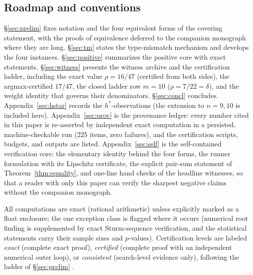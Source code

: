 \subsection{Roadmap and conventions}

\S\ref{sec:prelim} fixes notation and the four equivalent forms of the
covering statement, with the proofs of equivalence deferred to the
companion monograph where they are long. \S\ref{sec:tm} states the
type-mismatch mechanism and develops the four instances.
\S\ref{sec:positive} summarizes the positive core with exact statements.
\S\ref{sec:witness} presents the witness archive and the certification
ladder, including the exact value $\rho=16/47$ (certified from both
sides), the argmax-certified $17/47$, the closed ladder row $m=10$
($\rho=7/22=\delta$), and
the weight identity that governs their denominators.
\S\ref{sec:concl} concludes. Appendix~\ref{sec:hstar} records the
$h^*$-observations (the extension to $n=9,10$ is included here).
Appendix~\ref{sec:prov} is the provenance ledger: every number cited in
this paper is re-asserted by independent exact computation in a
persisted, machine-checkable run (225 items, zero failures), and the
certification scripts, budgets, and outputs are listed.
Appendix~\ref{sec:self} is the self-contained verification core: the
elementary identity behind the four forms, the runner formulation with
its Lipschitz certificate, the explicit pair-sum statement of
Theorem~\ref{thm:equality}, and one-line hand checks of the headline
witnesses, so that a reader with only this paper can verify the sharpest
negative claims without the companion monograph.

All computations are exact (rational arithmetic) unless explicitly marked
as a float enclosure; the one exception class is flagged where it occurs
(numerical root finding is supplemented by exact Sturm-sequence
verification, and the statistical statements carry their sample sizes and
$p$-values). Certification levels are labeled \emph{exact}
(complete exact proof), \emph{certified} (complete proof with an
independent numerical outer loop), or \emph{consistent} (search-level
evidence only), following the ladder of \S\ref{sec:prelim}
\cite{prog-artifacts}.
